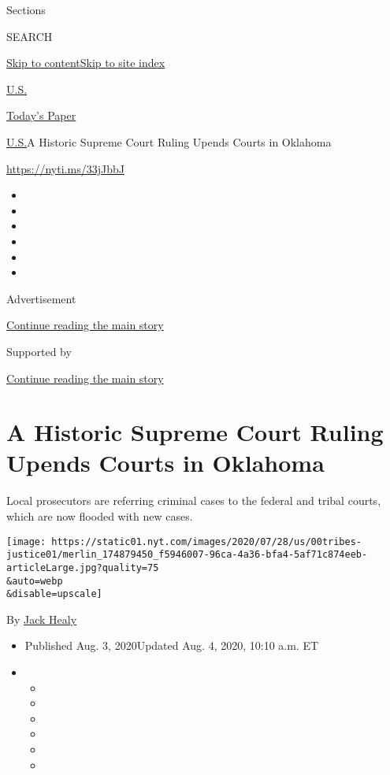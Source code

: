 Sections

SEARCH

\protect\hyperlink{site-content}{Skip to
content}\protect\hyperlink{site-index}{Skip to site index}

\href{https://www.nytimes.com/section/us}{U.S.}

\href{https://myaccount.nytimes.com/auth/login?response_type=cookie\&client_id=vi}{}

\href{https://www.nytimes.com/section/todayspaper}{Today's Paper}

\href{/section/us}{U.S.}\textbar{}A Historic Supreme Court Ruling Upends
Courts in Oklahoma

\url{https://nyti.ms/33jJbbJ}

\begin{itemize}
\item
\item
\item
\item
\item
\item
\end{itemize}

Advertisement

\protect\hyperlink{after-top}{Continue reading the main story}

Supported by

\protect\hyperlink{after-sponsor}{Continue reading the main story}

\hypertarget{a-historic-supreme-court-ruling-upends-courts-in-oklahoma}{%
\section{A Historic Supreme Court Ruling Upends Courts in
Oklahoma}\label{a-historic-supreme-court-ruling-upends-courts-in-oklahoma}}

Local prosecutors are referring criminal cases to the federal and tribal
courts, which are now flooded with new cases.

\texttt{[image: https://static01.nyt.com/images/2020/07/28/us/00tribes-justice01/merlin\_174879450\_f5946007-96ca-4a36-bfa4-5af71c874eeb-articleLarge.jpg?quality=75\\\&auto=webp\\\&disable=upscale]}

By \href{https://www.nytimes.com/by/jack-healy}{Jack Healy}

\begin{itemize}
\item
  Published Aug. 3, 2020Updated Aug. 4, 2020, 10:10 a.m. ET
\item
  \begin{itemize}
  \item
  \item
  \item
  \item
  \item
  \item
  \end{itemize}
\end{itemize}

